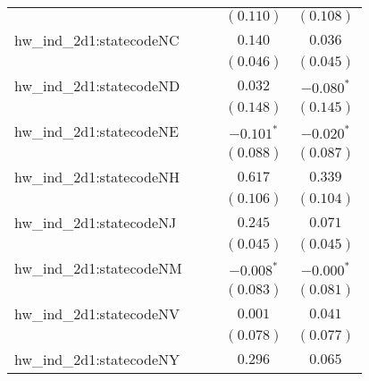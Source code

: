 \begin{center}
\begin{longtable}{l c c c c}
                         &                       &                       & $(0.110)$             & $(0.108)$             \\
hw\_ind\_2d1:statecodeNC &                       &                       & $0.140$               & $0.036$               \\
                         &                       &                       & $(0.046)$             & $(0.045)$             \\
hw\_ind\_2d1:statecodeND &                       &                       & $0.032$               & $\mathbf{-0.080}^{*}$ \\
                         &                       &                       & $(0.148)$             & $(0.145)$             \\
hw\_ind\_2d1:statecodeNE &                       &                       & $\mathbf{-0.101}^{*}$ & $\mathbf{-0.020}^{*}$ \\
                         &                       &                       & $(0.088)$             & $(0.087)$             \\
hw\_ind\_2d1:statecodeNH &                       &                       & $0.617$               & $0.339$               \\
                         &                       &                       & $(0.106)$             & $(0.104)$             \\
hw\_ind\_2d1:statecodeNJ &                       &                       & $0.245$               & $0.071$               \\
                         &                       &                       & $(0.045)$             & $(0.045)$             \\
hw\_ind\_2d1:statecodeNM &                       &                       & $\mathbf{-0.008}^{*}$ & $\mathbf{-0.000}^{*}$ \\
                         &                       &                       & $(0.083)$             & $(0.081)$             \\
hw\_ind\_2d1:statecodeNV &                       &                       & $0.001$               & $0.041$               \\
                         &                       &                       & $(0.078)$             & $(0.077)$             \\
hw\_ind\_2d1:statecodeNY &                       &                       & $0.296$               & $0.065$               \\

\end{longtable}
\end{center}

